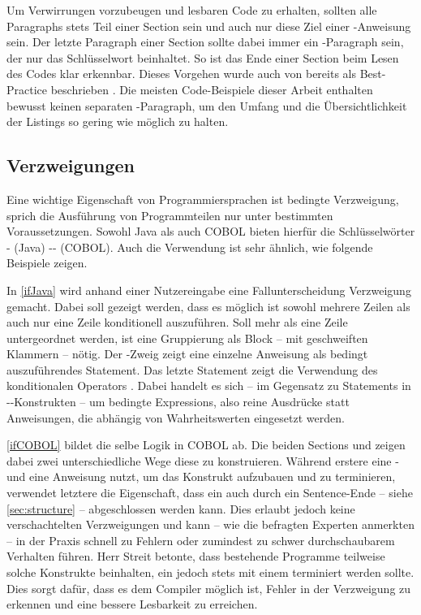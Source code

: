 Um Verwirrungen vorzubeugen und lesbaren Code zu erhalten, sollten alle Paragraphs stets Teil einer Section sein und auch nur diese Ziel einer -Anweisung sein. Der letzte Paragraph einer Section sollte dabei immer ein -Paragraph sein, der nur das Schlüsselwort  beinhaltet. So ist das Ende einer Section beim Lesen des Codes klar erkennbar. Dieses Vorgehen wurde auch von \citeauthor{richards_enhancing_1984} bereits \citeyear{richards_enhancing_1984} als Best-Practice beschrieben  \cite{richards_enhancing_1984}. Die meisten Code-Beispiele dieser Arbeit enthalten bewusst keinen separaten -Paragraph, um den Umfang und die Übersichtlichkeit der Listings so gering wie möglich zu halten. 

\subsection{Verzweigungen}
Eine wichtige Eigenschaft von Programmiersprachen ist bedingte Verzweigung, sprich die Ausführung von Programmteilen nur unter bestimmten Voraussetzungen. Sowohl Java als auch COBOL bieten hierfür die Schlüsselwörter - (Java) \bzw {}-- (COBOL). Auch die Verwendung ist sehr ähnlich, wie folgende Beispiele zeigen.


In \autoref{ifJava} wird anhand einer Nutzereingabe eine Fallunterscheidung \bzw Verzweigung gemacht. Dabei soll gezeigt werden, dass es möglich ist sowohl mehrere Zeilen als auch nur eine Zeile konditionell auszuführen. Soll mehr als eine Zeile untergeordnet werden, ist eine Gruppierung als Block -- mit geschweiften Klammern -- nötig. Der -Zweig zeigt eine einzelne Anweisung als bedingt auszuführendes Statement. Das letzte Statement zeigt die Verwendung des konditionalen Operators . Dabei handelt es sich -- im Gegensatz zu Statements in --Konstrukten -- um bedingte Expressions, also reine Ausdrücke statt Anweisungen, die abhängig von Wahrheitswerten eingesetzt werden.


\autoref{ifCOBOL} bildet die selbe Logik in COBOL ab. Die beiden Sections  und  zeigen dabei zwei unterschiedliche Wege diese zu konstruieren. Während erstere eine - und eine  Anweisung nutzt, um das Konstrukt aufzubauen und zu terminieren, verwendet letztere die Eigenschaft, dass ein  auch durch ein Sentence-Ende -- siehe \autoref{sec:structure} -- abgeschlossen werden kann. Dies erlaubt jedoch keine verschachtelten Verzweigungen und kann -- wie die befragten Experten anmerkten -- in der Praxis schnell zu Fehlern oder zumindest zu schwer durchschaubarem Verhalten führen. Herr Streit betonte, dass bestehende Programme teilweise solche Konstrukte beinhalten, ein  jedoch stets mit einem  terminiert werden sollte. Dies sorgt dafür, dass es dem Compiler möglich ist, Fehler in der Verzweigung zu erkennen und eine bessere Lesbarkeit zu erreichen.

